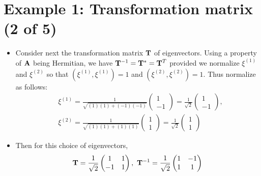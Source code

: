 \documentclass[11pt,a4paper]{article}
\begin{document}
	\section*{Example 1: Transformation matrix (2 of 5)}
	\begin{itemize}
		\item Consider next the transformation matrix $\vb{T}$ of eigenvectors. Using a property of $\vb{A}$ being Hermitian, we have $\vb{T}^{-1} = \vb{T}^* = \vb{T}^T$  provided we normalize $\xi^{(1)}$ and $\xi^{(2)}$ so that $(\xi^{(1)}, \xi^{(1)}) = 1$ and $(\xi^{(2)}, \xi^{(2)}) = 1$. Thus normalize as follows:
		\begin{align*}
			&\xi^{(1)} = \frac{1}{\sqrt{(1)(1) + (-1)(-1)}}
			\begin{pmatrix}
				1\\
				-1
			\end{pmatrix} = \frac{1}{\sqrt{2}}
			\begin{pmatrix}
				1\\
				-1
			\end{pmatrix},\\
			&\xi^{(2)} = \frac{1}{\sqrt{(1)(1) + (1)(1)}}
			\begin{pmatrix}
				1\\
				1
			\end{pmatrix} = \frac{1}{\sqrt{2}}
			\begin{pmatrix}
				1\\
				1
			\end{pmatrix}
		\end{align*}
		\item Then for this choice of eigenvectors,
		$$
		\vb{T} = \frac{1}{\sqrt{2}}
		\begin{pmatrix}
			1 & 1\\
			-1 & 1
		\end{pmatrix},\ \vb{T}^{-1}=\frac{1}{\sqrt{2}}
		\begin{pmatrix}
			1 & -1\\
			1 & 1
		\end{pmatrix}
		$$
	\end{itemize}
\end{document}
